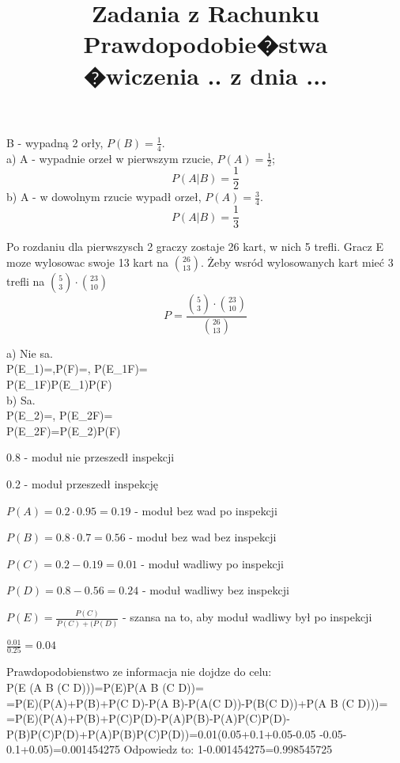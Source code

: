 \documentclass[fleqn]{article}
\begin{document}
\title{Zadania z Rachunku Prawdopodobie�stwa \\ �wiczenia .. z dnia ...}
\date{}
\medskip


B - wypadną 2 orły, $P(B) = \frac{1}{4}$. \\
a) A - wypadnie orzeł w pierwszym rzucie, $P(A) = \frac{1}{2}$; \\
   \[P(A|B) = \frac{1}{2}\]
b) A - w dowolnym rzucie wypadł orzeł, $P(A) = \frac{3}{4}$. \\
   \[P(A|B) =\frac{1}{3}\]

\medskip

\medskip

Po rozdaniu dla pierwszysch 2 graczy zostaje 26 kart, w nich 5 trefli. Gracz E moze wylosowac swoje 13 kart na ${26 \choose 13}$. Żeby wsród wylosowanych kart mieć 3 trefli na ${5 \choose 3}\cdot{23 \choose 10}$\\
\[P = \frac{{5 \choose 3}\cdot{23 \choose 10}}{{26 \choose 13}}\]

\medskip

\medskip

a) Nie sa.\\
P(E_{1})=,P(F)=, P(E_{1}\cap F)=\\ P(E_{1}\cap F)\neq P(E_{1})P(F)\\
b) Sa.\\
P(E_{2})=, P(E_{2}\cap F)=\\
P(E_{2}\cap F)=P(E_{2})P(F)\\

\medskip
{}
\medskip

0.8 - moduł nie przeszedł inspekcji

0.2 - moduł przeszedł inspekcję

$P(A) = 0.2 \cdot 0.95 = 0.19$ - moduł bez wad po inspekcji

$P(B) = 0.8 \cdot 0.7 = 0.56$ - moduł bez wad bez inspekcji

$P(C) = 0.2 - 0.19 = 0.01$ - moduł wadliwy po inspekcji

$P(D) = 0.8 - 0.56 = 0.24$ - moduł wadliwy bez inspekcji

$P(E) = \frac{P(C)}{P(C)+(P(D)}$ - szansa na to, aby moduł wadliwy był po inspekcji

$\frac{0.01}{0.25} = 0.04$


\medskip
{}
\medskip
Prawdopodobienstwo ze informacja nie dojdze do celu:\\
P(E \cap (A \cup B \cup (C \cap D)))=P(E)P(A \cup B \cup (C \cap D))=\\=P(E)(P(A)+P(B)+P(C \cap D)-P(A \cap B)-P(A\cap (C \cap D))-P(B\cap (C \cap D))+P(A \cap B \cap (C \cap D)))=\\=P(E)(P(A)+P(B)+P(C)P(D)-P(A)P(B)-P(A)P(C)P(D)-P(B)P(C)P(D)+P(A)P(B)P(C)P(D))=0.01\cdot (0.05+0.1+0.05-0.05 -0.05-0.1+0.05)=0.001454275
Odpowiedz to: 1-0.001454275=0.998545725
\newpage
\medskip
{}
\medskip
\end{document}
